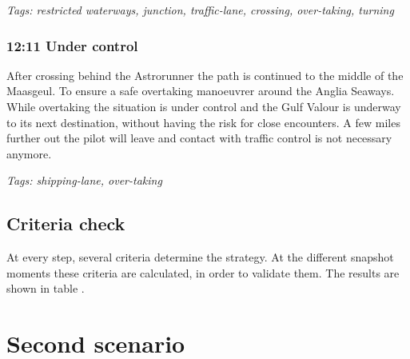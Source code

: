 \emph{Tags: restricted waterways, junction, traffic-lane, crossing, over-taking, turning}

\subsubsection{12:11 Under control}
After crossing behind the Astrorunner the path is continued to the middle of the Maasgeul. To ensure a safe overtaking manoeuvrer around the Anglia Seaways. While overtaking the situation is under control and the Gulf Valour is underway to its next destination, without having the risk for close encounters. A few miles further out the pilot will leave and contact with traffic control is not necessary anymore.

\emph{Tags: shipping-lane, over-taking}

\subsection{Criteria check}
At every step, several criteria determine the strategy. At the different snapshot moments these criteria are calculated, in order to validate them. The results are shown in table .


\section{Second scenario}
